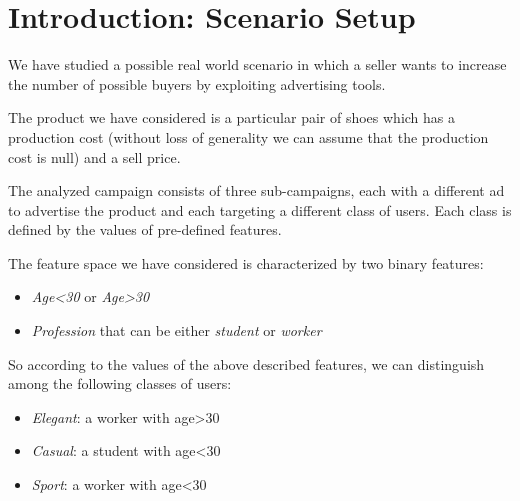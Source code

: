 \chapter{Introduction: Scenario Setup}
We have studied a possible real world scenario in which a seller wants to increase the number of possible buyers by exploiting advertising tools.

The product we have considered is a particular pair of shoes which has a production cost (without loss of generality we can assume that the production cost is null) and a sell price.

The analyzed campaign consists of three sub-campaigns, each with a different ad to advertise the product and each targeting a different class of users. Each class is defined by the values of pre-defined features.

The feature space we have considered is characterized by two binary features: 
\begin{itemize}
\item \textit{Age<30} or \textit{Age>30}
\item \textit{Profession} that can be either \textit{student} or \textit{worker}
\end{itemize}

So according to the values of the above described features, we can distinguish among the following classes of users:
\begin{itemize}
\item \textit{Elegant}: a worker with age>30
\item \textit{Casual}: a student with age<30
\item \textit{Sport}: a worker with age<30
\end{itemize}
